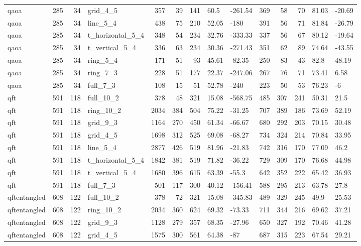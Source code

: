 \begin{longtable}{lrrlrrrllrrrll}
qaoa & 285 & 34 & grid\_4\_5 & 357 & 39 & 141 & 60.5 & -261.54 & 369 & 58 & 70 & 81.03 & -20.69 \\
qaoa & 285 & 34 & line\_5\_4 & 438 & 75 & 210 & 52.05 & -180 & 391 & 56 & 71 & 81.84 & -26.79 \\
qaoa & 285 & 34 & t\_horizontal\_5\_4 & 348 & 54 & 234 & 32.76 & -333.33 & 337 & 56 & 67 & 80.12 & -19.64 \\
qaoa & 285 & 34 & t\_vertical\_5\_4 & 336 & 63 & 234 & 30.36 & -271.43 & 351 & 62 & 89 & 74.64 & -43.55 \\
qaoa & 285 & 34 & ring\_5\_4 & 171 & 51 & 93 & 45.61 & -82.35 & 250 & 83 & 43 & 82.8 & 48.19 \\
qaoa & 285 & 34 & ring\_7\_3 & 228 & 51 & 177 & 22.37 & -247.06 & 267 & 76 & 71 & 73.41 & 6.58 \\
qaoa & 285 & 34 & full\_7\_3 & 108 & 15 & 51 & 52.78 & -240 & 223 & 50 & 53 & 76.23 & -6 \\
qft & 591 & 118 & full\_10\_2 & 378 & 48 & 321 & 15.08 & -568.75 & 485 & 307 & 241 & 50.31 & 21.5 \\
qft & 591 & 118 & ring\_10\_2 & 2034 & 384 & 504 & 75.22 & -31.25 & 707 & 389 & 186 & 73.69 & 52.19 \\
qft & 591 & 118 & grid\_9\_3 & 1164 & 270 & 450 & 61.34 & -66.67 & 680 & 292 & 203 & 70.15 & 30.48 \\
qft & 591 & 118 & grid\_4\_5 & 1698 & 312 & 525 & 69.08 & -68.27 & 734 & 324 & 214 & 70.84 & 33.95 \\
qft & 591 & 118 & line\_5\_4 & 2877 & 426 & 519 & 81.96 & -21.83 & 742 & 316 & 170 & 77.09 & 46.2 \\
qft & 591 & 118 & t\_horizontal\_5\_4 & 1842 & 381 & 519 & 71.82 & -36.22 & 729 & 309 & 170 & 76.68 & 44.98 \\
qft & 591 & 118 & t\_vertical\_5\_4 & 1680 & 396 & 615 & 63.39 & -55.3 & 642 & 352 & 222 & 65.42 & 36.93 \\
qft & 591 & 118 & full\_7\_3 & 501 & 117 & 300 & 40.12 & -156.41 & 588 & 295 & 213 & 63.78 & 27.8 \\
qftentangled & 608 & 122 & full\_10\_2 & 378 & 72 & 321 & 15.08 & -345.83 & 489 & 329 & 245 & 49.9 & 25.53 \\
qftentangled & 608 & 122 & ring\_10\_2 & 2034 & 360 & 624 & 69.32 & -73.33 & 711 & 344 & 216 & 69.62 & 37.21 \\
qftentangled & 608 & 122 & grid\_9\_3 & 1128 & 279 & 357 & 68.35 & -27.96 & 650 & 327 & 192 & 70.46 & 41.28 \\
qftentangled & 608 & 122 & grid\_4\_5 & 1575 & 300 & 561 & 64.38 & -87 & 687 & 315 & 223 & 67.54 & 29.21 \\

\end{longtable}
